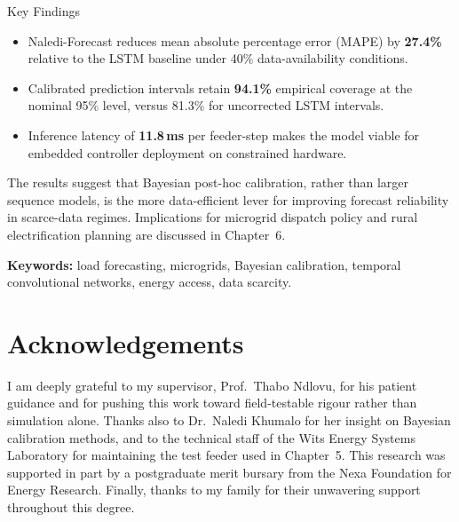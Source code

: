 \documentclass[12pt,a4paper]{report}
\begin{document}
\begin{keybox}{Key Findings}
\begin{itemize}
  \item Naledi-Forecast reduces mean absolute percentage error (MAPE) by \textbf{27.4\%}
        relative to the LSTM baseline under 40\% data-availability conditions.
  \item Calibrated prediction intervals retain \textbf{94.1\%} empirical coverage at the
        nominal 95\% level, versus 81.3\% for uncorrected LSTM intervals.
  \item Inference latency of \textbf{11.8\,ms} per feeder-step makes the model viable for
        embedded controller deployment on constrained hardware.
\end{itemize}
\end{keybox}

The results suggest that Bayesian post-hoc calibration, rather than larger sequence models,
is the more data-efficient lever for improving forecast reliability in scarce-data regimes.
Implications for microgrid dispatch policy and rural electrification planning are discussed
in Chapter~6.

\vspace{0.6cm}
\noindent\textbf{Keywords:} load forecasting, microgrids, Bayesian calibration, temporal
convolutional networks, energy access, data scarcity.

\chapter*{Acknowledgements}

I am deeply grateful to my supervisor, Prof.\ Thabo Ndlovu, for his patient guidance and
for pushing this work toward field-testable rigour rather than simulation alone. Thanks also
to Dr.\ Naledi Khumalo for her insight on Bayesian calibration methods, and to the technical
staff of the Wits Energy Systems Laboratory for maintaining the test feeder used in
Chapter~5. This research was supported in part by a postgraduate merit bursary from the
Nexa Foundation for Energy Research. Finally, thanks to my family for their unwavering
support throughout this degree.

\tableofcontents
\listoffigures
\listoftables
\end{document}
